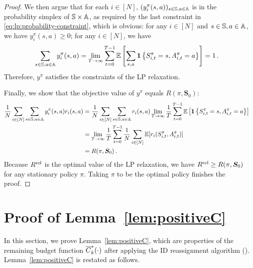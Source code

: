 \begin{proof}
We then argue that for each $i\in [N]$, $(y_i^\pi(s,a))_{s\in\mathbb{S}, a\in\mathbb{A}}$ is in the probability simplex of $\mathbb{S}\times \mathbb{A}$, as required by the last constraint in \eqref{eq:lp:probability-constraint}, which is obvious: for any $i\in [N]$ and $s\in\mathbb{S}, a\in\mathbb{A}$, we have $y^\pi_i(s,a)\geq 0$; for any $i\in[N]$, we have 
\begin{align*}
    \sum_{s\in\mathbb{S},a\in\mathbb{A}}y_i^\pi(s,a)= \lim_{T\to\infty}\sum_{t=0}^{T-1} \mathbb{E}\left[\sum_{s,a}\mathbf{1}\left\{ S_{i,t}^\pi=s,A_{i,t}^\pi=a \right\}\right]=1\,.
\end{align*} Therefore, $y^\pi$ satisfies the constraints of the LP relaxation. 

Finally, we show that the objective value of $y^\pi$ equals $R(\pi,\bm{S}_0)$:
\begin{align*}
    \frac{1}{N}\sum_{i\in[N]} \sum_{s\in\mathbb{S},a\in\mathbb{A}} y_i^\pi(s,a)r_i(s,a)
    &=\frac{1}{N}\sum_{i\in[N]} \sum_{s\in\mathbb{S},a\in\mathbb{A}} r_i(s,a) \lim_{T\to\infty} \frac{1}{T}\sum_{t=0}^{T-1}\mathbb{E}\left[\mathbf{1}\left\{ S_{i,t}^\pi=s,A_{i,t}^\pi=a \right\}\right]\\
    &= \lim_{T\to\infty} \frac{1}{T} \sum_{t=0}^{T-1}\frac{1}{N}\sum_{i\in[N]} \mathbb{E}[r_i(S_{i,t}^\pi,A_{i,t}^\pi)]\\
    &= R(\pi,\bm{S}_0)\,.
\end{align*}
Because $R^{\textup{rel}}$ is the optimal value of the LP relaxation, we have $R^{\textup{rel}} \geq R(\pi,\bm{S}_0)$ for any stationary policy $\pi$. Taking $\pi$ to be the optimal policy finishes the proof. 
\end{proof}





\section{Proof of Lemma~\ref{lem:positiveC}}\label{app:proof-lem-positiveC}
In this section, we prove Lemma~\ref{lem:positiveC}, which are properties of the remaining budget function $\overline{C}^*_k(\cdot)$ after applying the ID reassignment algorithm (). Lemma~\ref{lem:positiveC} is restated as follows. 

\positiveC*

